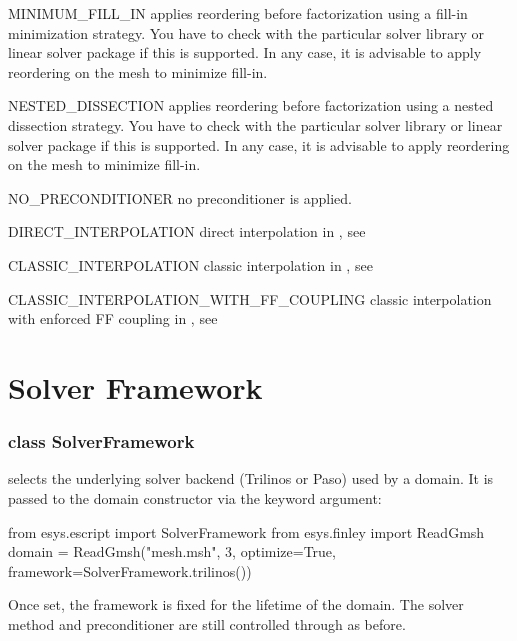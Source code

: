 \begin{memberdesc}[SolverOptions]{MINIMUM_FILL_IN}
applies reordering before factorization using a fill-in minimization strategy.
You have to check with the particular solver library or linear solver package
if this is supported. In any case, it is advisable to apply reordering on the
mesh to minimize fill-in.
\end{memberdesc}

\begin{memberdesc}[SolverOptions]{NESTED_DISSECTION}
applies reordering before factorization using a nested dissection strategy.
You have to check with the particular solver library or linear solver package
if this is supported. In any case, it is advisable to apply reordering on the
mesh to minimize fill-in.
\end{memberdesc}

\begin{memberdesc}[SolverOptions]{NO_PRECONDITIONER}
no preconditioner is applied.
\end{memberdesc}

\begin{memberdesc}[SolverOptions]{DIRECT_INTERPOLATION}
direct interpolation in \AMG, see \cite{AMG}
\end{memberdesc}
\begin{memberdesc}[SolverOptions]{CLASSIC_INTERPOLATION}
classic interpolation in \AMG, see \cite{AMG}
\end{memberdesc}
\begin{memberdesc}[SolverOptions]{CLASSIC_INTERPOLATION_WITH_FF_COUPLING}
classic interpolation with enforced FF coupling in \AMG, see \cite{AMG}
\end{memberdesc}

\section{Solver Framework}
\label{SEC Solver Framework}

\subsubsection*{class SolverFramework}
 selects the underlying solver backend (Trilinos or Paso)
used by a domain.  It is passed to the domain constructor via the
 keyword argument:
\begin{python}
from esys.escript import SolverFramework
from esys.finley import ReadGmsh
domain = ReadGmsh("mesh.msh", 3, optimize=True,
                  framework=SolverFramework.trilinos())
\end{python}
Once set, the framework is fixed for the lifetime of the domain.
The solver method and preconditioner are still controlled through
 as before.

